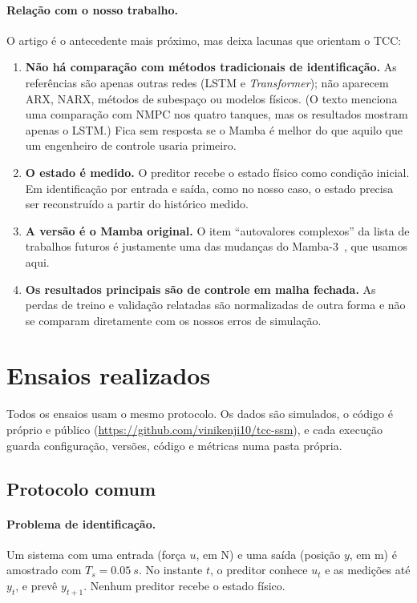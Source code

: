 \documentclass[11pt,a4paper]{article}
\begin{document}
\paragraph{Relação com o nosso trabalho.} O artigo é o antecedente mais próximo, mas deixa lacunas
que orientam o TCC:
\begin{enumerate}\itemsep0pt
  \item \textbf{Não há comparação com métodos tradicionais de identificação.} As referências são
  apenas outras redes (LSTM e \emph{Transformer}); não aparecem ARX, NARX, métodos de subespaço ou
  modelos físicos. (O texto menciona uma comparação com NMPC nos quatro tanques, mas os resultados
  mostram apenas o LSTM.) Fica sem resposta se o Mamba é melhor do que aquilo que um engenheiro de
  controle usaria primeiro.
  \item \textbf{O estado é medido.} O preditor recebe o estado físico como condição inicial. Em
  identificação por entrada e saída, como no nosso caso, o estado precisa ser reconstruído a partir
  do histórico medido.
  \item \textbf{A versão é o Mamba original.} O item ``autovalores complexos'' da lista de trabalhos
  futuros é justamente uma das mudanças do Mamba-3~\cite{lahoti2026mamba3}, que usamos aqui.
  \item \textbf{Os resultados principais são de controle em malha fechada.} As perdas de treino e
  validação relatadas são normalizadas de outra forma e não se comparam diretamente com os nossos
  erros de simulação.
\end{enumerate}

\section{Ensaios realizados}\label{sec:ensaios}

Todos os ensaios usam o mesmo protocolo. Os dados são simulados, o código é próprio e público
(\url{https://github.com/vinikenji10/tcc-ssm}), e cada execução guarda configuração, versões, código e
métricas numa pasta própria.

\subsection{Protocolo comum}

\paragraph{Problema de identificação.} Um sistema com uma entrada (força $u$, em N) e uma saída
(posição $y$, em m) é amostrado com $T_s=\SI{0,05}{s}$. No instante $t$, o preditor conhece $u_t$ e
as medições até $y_t$, e prevê $y_{t+1}$. Nenhum preditor recebe o estado físico.
\end{document}
